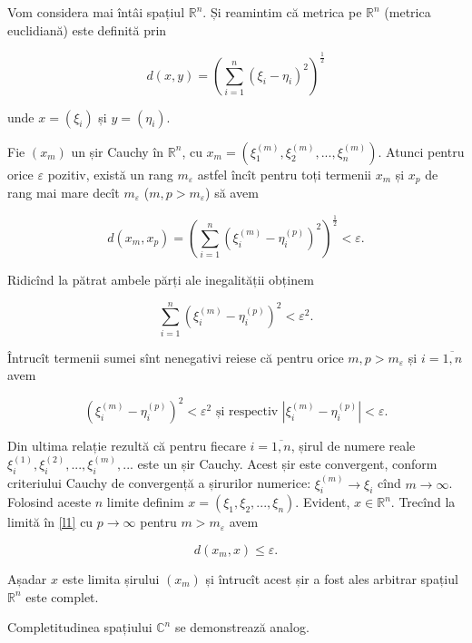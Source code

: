 \documentclass[a4paper,12pt]{article}
\theoremstyle{change}
\newenvironment{proof}[1][Proof]{\begin{trivlist}
\item[\hskip \labelsep {\bfseries #1}]}{\end{trivlist}}
\begin{document}
\begin{proof}[Într-adevăr]
Vom considera mai întâi spațiul $\mathbb{R}^n$.
Și reamintim că metrica pe $\mathbb{R}^n$ (metrica euclidiană) este definită prin 

\[ d(x,y) = \left(\sum_{i=1}^n (\xi_i - \eta_i)^2\right)^\frac{1}{2} \]

\noindent unde $x=(\xi_i)$ și $y=(\eta_i)$. 

Fie $(x_m)$ un șir Cauchy în $\mathbb{R}^n$, cu $x_m=(\xi_1^{(m)},\xi_2^{(m)},...,\xi_n^{(m)})$. Atunci pentru orice $\varepsilon$ pozitiv, există un rang $m_{\varepsilon}$ astfel încît pentru toți termenii $x_m$ și $x_p$ de rang mai mare decît $m_{\varepsilon}$ ($m,p>m_{\varepsilon}$) să avem

\begin{equation}\label{l1}
d(x_m,x_p) = \left(\sum_{i=1}^n (\xi_i^{(m)}-\eta_i^{(p)})^2\right)^\frac{1}{2} < \varepsilon.
\end{equation}

Ridicînd la pătrat ambele părți ale inegalității obținem

\[ \sum_{i=1}^n (\xi_i^{(m)}-\eta_i^{(p)})^2 < \varepsilon^2. \]

Întrucît termenii sumei sînt nenegativi reiese că pentru orice $m,p>m_\varepsilon$ și $i=\overline{1,n}$ avem

\[ (\xi_i^{(m)}-\eta_i^{(p)})^2 < \varepsilon^2 \text{ și respectiv } |\xi_i^{(m)}-\eta_i^{(p)}| < \varepsilon. \]

Din ultima relație rezultă că pentru fiecare $i=\overline{1,n}$,  șirul de numere reale $\xi_i^{(1)}, \xi_i^{(2)}, ..., \xi_i^{(m)}, ...$ este un șir Cauchy. Acest șir este convergent, conform criteriului Cauchy de convergență a șirurilor numerice: $\xi_i^{(m)}\to \xi_i$ cînd $m\to\infty$. Folosind aceste $n$ limite definim $x=(\xi_1,\xi_2,...,\xi_n)$. Evident, $x\in\mathbb{R}^n$. Trecînd la limită în \eqref{l1} cu $p\to\infty$ pentru $m>m_\varepsilon$ avem

\[ d(x_m,x)\leq\varepsilon. \]

Așadar $x$ este limita șirului $(x_m)$ și întrucît acest șir a fost ales arbitrar spațiul $\mathbb{R}^n$ este complet.

Completitudinea spațiului $\mathbb{C}^n$ se demonstrează analog.


\end{proof}
\end{document}
